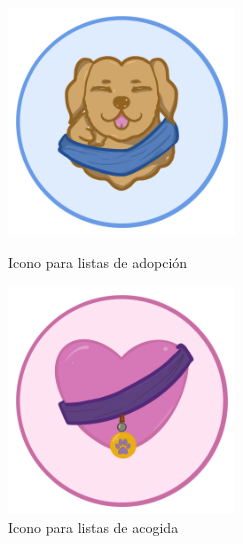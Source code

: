 \documentclass[a4paper, 12pt]{article}
\begin{document}
\begin{figure}[H]
   	\begin{minipage}{0.48\textwidth}
		\begin{center}
			{\includegraphics[width=6cm]{Adoptar.png}\par}
			\caption{Icono para listas de adopción}
		\end{center}  
	\end{minipage}\hfill
   	\begin{minipage}{0.48\textwidth}
		\begin{center}
			{\includegraphics[width=6cm]{Acoger.png}\par}
			\caption{Icono para listas de acogida}
		\end{center}  
	\end{minipage}\hfill
\end{figure}
\end{document}
